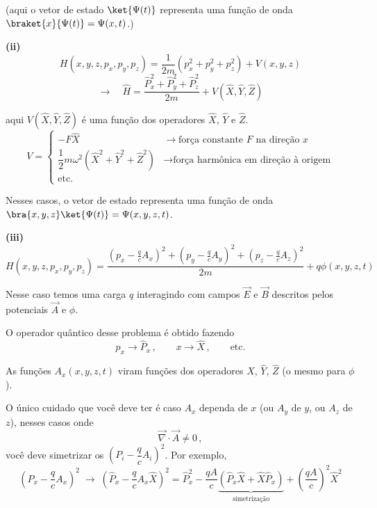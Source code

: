 (aqui o vetor de estado $\ket{\Psi(t)}$ representa uma função de onda $\braket{x}{\Psi(t)} = \Psi(x,t)$.)

\textbf{(ii)}
\begin{equation}
    H(x,y,z,p_x,p_y,p_z) = \frac{1}{2m}(p_x^2+p_y^2+p_z^2) + V(x,y,z)
\label{eq:aula13_exemplo_ii}
\end{equation}
\begin{equation}
    \longrightarrow \quad \hat{H} = \frac{\hat{P}_x^2+\hat{P}_y^2+\hat{P}_z^2}{2m} + V(\hat{X},\hat{Y},\hat{Z})
\label{eq:aula13_exemplo_ii_quantico}
\end{equation}

aqui $V(\hat{X},\hat{Y},\hat{Z})$ é uma função dos operadores $\hat{X}$, $\hat{Y}$ e $\hat{Z}$.
\begin{equation}
    V = \begin{cases}
        -F\hat{X} & \to \text{força constante $F$ na direção $x$} \\[2mm]
        \dfrac{1}{2}m\omega^2(\hat{X}^2+\hat{Y}^2+\hat{Z}^2) & \to \text{força harmônica em direção à origem} \\[2mm]
        \text{etc.}
    \end{cases}
\label{eq:aula13_V_exemplos}
\end{equation}

Nesses casos, o vetor de estado representa uma função de onda $\bra{x,y,z}\ket{\Psi(t)} = \Psi(x,y,z,t)$.

\textbf{(iii)}
\begin{equation}
    H(x,y,z,p_x,p_y,p_z) = \frac{\left(p_x - \frac{q}{c}A_x\right)^2 + \left(p_y - \frac{q}{c}A_y\right)^2 + \left(p_z - \frac{q}{c}A_z\right)^2}{2m} + q\phi(x,y,z,t)
\label{eq:aula13_exemplo_iii}
\end{equation}

Nesse caso temos uma carga $q$ interagindo com campos $\vec{E}$ e $\vec{B}$ descritos pelos potenciais $\vec{A}$ e $\phi$.

O operador quântico desse problema é obtido fazendo
\begin{equation}
    p_x \to \hat{P}_x \, , \qquad x \to \hat{X} \, , \qquad \text{etc.}
\label{eq:aula13_substituicao_quantica}
\end{equation}

As funções $A_x(x,y,z,t)$ viram funções dos operadores $\hat{X}$, $\hat{Y}$, $\hat{Z}$ (o mesmo para $\phi$).

O único cuidado que você deve ter é caso $A_x$ dependa de $x$ (ou $A_y$ de $y$, ou $A_z$ de $z$), nesses casos onde
\begin{equation}
    \vec{\nabla}\cdot\vec{A} \neq 0 \, ,
\label{eq:aula13_divA_nonzero}
\end{equation}
você deve simetrizar os $\left(P_i - \dfrac{q}{c}A_i\right)^2$. Por exemplo,
\begin{equation}
    \left(P_x - \frac{q}{c}A_x\right)^2 \;\to\; \left(\hat{P}_x - \frac{q}{c}A_x\hat{X}\right)^2 = \hat{P}_x^2 - \frac{qA}{c}\underbrace{\left(\hat{P}_x\hat{X} + \hat{X}\hat{P}_x\right)}_{\text{simetrização}} + \left(\frac{qA}{c}\right)^2\hat{X}^2
\label{eq:aula13_simetrizacao}
\end{equation}

